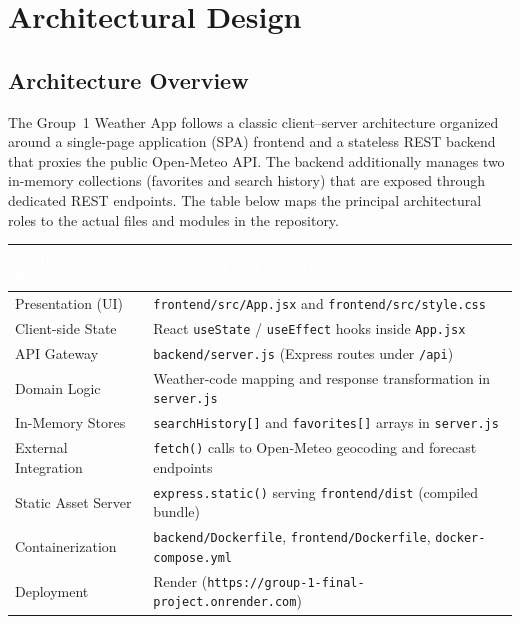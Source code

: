 \documentclass[11pt,letterpaper]{article}
\newcommand{\thead}[1]{\textcolor{white}{\bfseries #1}}
\begin{document}
\section{Architectural Design}

\subsection{Architecture Overview}
The Group~1 Weather App follows a classic client--server architecture organized around a single-page application (SPA) frontend and a stateless REST backend that proxies the public Open-Meteo API. The backend additionally manages two in-memory collections (favorites and search history) that are exposed through dedicated REST endpoints. The table below maps the principal architectural roles to the actual files and modules in the repository.

\begin{tabularx}{\linewidth}{| L{1.7in} | Y |}
\hline
{}\thead{Architectural Role} & \thead{Weather App File / Module} \\
\hline
Presentation (UI)        & \texttt{frontend/src/App.jsx} and \texttt{frontend/src/style.css} \\ \hline
{}Client-side State        & React \texttt{useState} / \texttt{useEffect} hooks inside \texttt{App.jsx} \\ \hline
API Gateway              & \texttt{backend/server.js} (Express routes under \texttt{/api}) \\ \hline
{}Domain Logic             & Weather-code mapping and response transformation in \texttt{server.js} \\ \hline
In-Memory Stores         & \texttt{searchHistory[]} and \texttt{favorites[]} arrays in \texttt{server.js} \\ \hline
{}External Integration     & \texttt{fetch()} calls to Open-Meteo geocoding and forecast endpoints \\ \hline
Static Asset Server      & \texttt{express.static()} serving \texttt{frontend/dist} (compiled bundle) \\ \hline
{}Containerization         & \texttt{backend/Dockerfile}, \texttt{frontend/Dockerfile}, \texttt{docker-compose.yml} \\ \hline
Deployment               & Render (\texttt{https://group-1-final-project.onrender.com}) \\ \hline
\end{tabularx}
\end{document}
